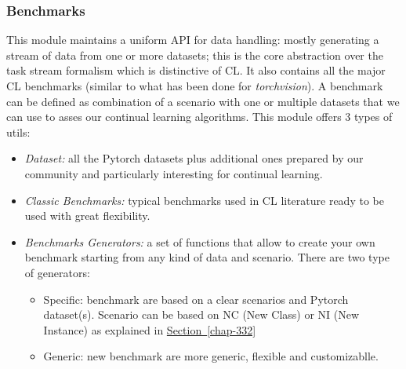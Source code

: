 \documentclass[english, LaM, oneside]{sapthesis}%
\begin{document}
\subsubsection{Benchmarks}
This module maintains a uniform API for data handling: mostly generating a stream of data from one or more datasets; this is the core abstraction over the task stream formalism which is distinctive of CL. It also contains all the major CL benchmarks (similar to what has been done for \textit{torchvision}). A benchmark can be defined as combination of a scenario with one or multiple datasets that we can use to asses our continual learning algorithms. This module offers 3 types of utils:
\begin{itemize}
    \item \textit{Dataset:} all the Pytorch datasets plus additional ones prepared by our community and particularly interesting for continual learning.
    \item \textit{Classic Benchmarks:} typical benchmarks used in CL literature ready to be used with great flexibility.
    \item\textit{ Benchmarks Generators:} a set of functions that allow to create your own benchmark starting from any kind of data and scenario. There are two type of generators:
    \begin{itemize}
        \item Specific: benchmark are based on a clear scenarios and Pytorch dataset(s). Scenario can be based on NC (New Class) or NI (New Instance) as explained in \hyperref[chap-332]{Section~\ref*{chap-332}} 
        \item Generic: new benchmark are more generic, flexible and customizablle.
    \end{itemize}

\end{itemize}
\end{document}
